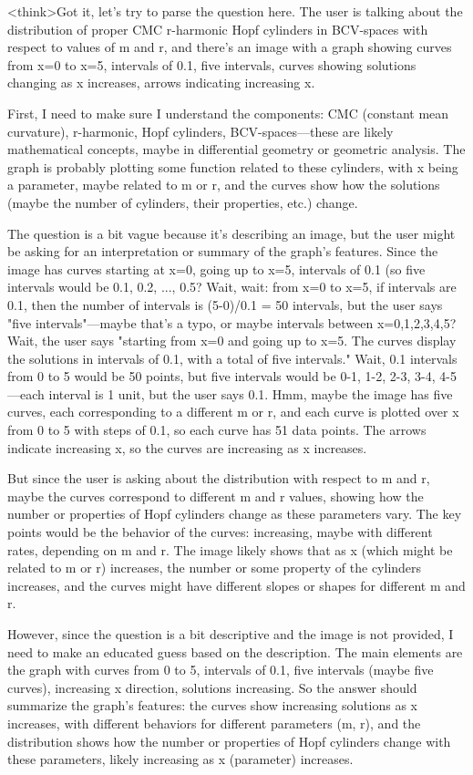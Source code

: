 <think>Got it, let's try to parse the question here. The user is talking about the distribution of proper CMC r-harmonic Hopf cylinders in BCV-spaces with respect to values of m and r, and there's an image with a graph showing curves from x=0 to x=5, intervals of 0.1, five intervals, curves showing solutions changing as x increases, arrows indicating increasing x. 

First, I need to make sure I understand the components: CMC (constant mean curvature), r-harmonic, Hopf cylinders, BCV-spaces—these are likely mathematical concepts, maybe in differential geometry or geometric analysis. The graph is probably plotting some function related to these cylinders, with x being a parameter, maybe related to m or r, and the curves show how the solutions (maybe the number of cylinders, their properties, etc.) change. 

The question is a bit vague because it's describing an image, but the user might be asking for an interpretation or summary of the graph's features. Since the image has curves starting at x=0, going up to x=5, intervals of 0.1 (so five intervals would be 0.1, 0.2, ..., 0.5? Wait, wait: from x=0 to x=5, if intervals are 0.1, then the number of intervals is (5-0)/0.1 = 50 intervals, but the user says "five intervals"—maybe that's a typo, or maybe intervals between x=0,1,2,3,4,5? Wait, the user says "starting from x=0 and going up to x=5. The curves display the solutions in intervals of 0.1, with a total of five intervals." Wait, 0.1 intervals from 0 to 5 would be 50 points, but five intervals would be 0-1, 1-2, 2-3, 3-4, 4-5—each interval is 1 unit, but the user says 0.1. Hmm, maybe the image has five curves, each corresponding to a different m or r, and each curve is plotted over x from 0 to 5 with steps of 0.1, so each curve has 51 data points. The arrows indicate increasing x, so the curves are increasing as x increases. 

But since the user is asking about the distribution with respect to m and r, maybe the curves correspond to different m and r values, showing how the number or properties of Hopf cylinders change as these parameters vary. The key points would be the behavior of the curves: increasing, maybe with different rates, depending on m and r. The image likely shows that as x (which might be related to m or r) increases, the number or some property of the cylinders increases, and the curves might have different slopes or shapes for different m and r. 

However, since the question is a bit descriptive and the image is not provided, I need to make an educated guess based on the description. The main elements are the graph with curves from 0 to 5, intervals of 0.1, five intervals (maybe five curves), increasing x direction, solutions increasing. So the answer should summarize the graph's features: the curves show increasing solutions as x increases, with different behaviors for different parameters (m, r), and the distribution shows how the number or properties of Hopf cylinders change with these parameters, likely increasing as x (parameter) increases. 


